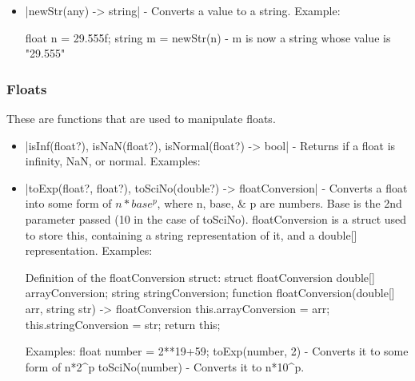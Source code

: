 \documentclass[12pt, letterpaper, oneside]{article}
\begin{document}
\begin{itemize}
		
		\begin{spverbatim}
			float n = 29f;
			double m = scaleDec(n, 64); - m is now a double with the value of 29.
		\end{spverbatim}
		\item[--] \spverb|newStr(any) -> string| - Converts a value to a string. Example:
		
		
		\begin{spverbatim}
			float n = 29.555f;
			string m = newStr(n) - m is now a string whose value is "29.555"
		\end{spverbatim}
	\end{itemize}
	\newpage
	\subsubsection{Floats}
	These are functions that are used to manipulate floats.
	\begin{itemize}
		\item[--] \spverb|isInf(float?), isNaN(float?), isNormal(float?) -> bool| - Returns if a float is infinity, NaN, or normal. Examples:
		\item[--] \spverb|toExp(float?, float?), toSciNo(double?) -> floatConversion| - Converts a float into some form of $n*base^{p}$, where n, base, \& p are numbers. Base is the 2nd parameter passed (10 in the case of toSciNo). floatConversion is a struct used to store this, containing a string representation of it, and a double[] representation. Examples:
		\begin{spverbatim}
			Definition of the floatConversion struct:
			struct floatConversion {
				double[] arrayConversion;
				string stringConversion;
				function floatConversion(double[] arr, string str) -> floatConversion {
					this.arrayConversion = arr;
					this.stringConversion = str;
					return this;
				}
			}
		\end{spverbatim}
		\begin{spverbatim}
			Examples:
			float number = 2**19+59;
			toExp(number, 2) - Converts it to some form of n*2^p
			toSciNo(number) - Converts it to n*10^p.
		\end{spverbatim}
	\end{itemize}
	\newpage
\end{document}
